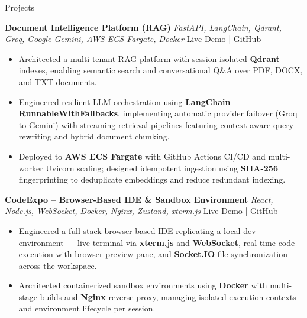 \documentclass{resume}
\begin{document}
\begin{rSection}{Projects}

\scriptsize \textbf{Document Intelligence Platform (RAG)}
{\scriptsize \textit{FastAPI, LangChain, Qdrant, Groq, Google Gemini, AWS ECS Fargate, Docker}}
\hfill
\href{https://aidoc.harshsaw.ca/}{Live Demo} | 
\href{https://github.com/Harshksaw/document_portal}{GitHub}

\begin{itemize}\itemsep -4pt
    \item Architected a multi-tenant RAG platform with session-isolated \textbf{Qdrant} indexes, enabling semantic search and conversational Q\&A over PDF, DOCX, and TXT documents.
    \item Engineered resilient LLM orchestration using \textbf{LangChain RunnableWithFallbacks}, implementing automatic provider failover (Groq to Gemini) with streaming retrieval pipelines featuring context-aware query rewriting and hybrid document chunking.
    \item Deployed to \textbf{AWS ECS Fargate} with GitHub Actions CI/CD and multi-worker Uvicorn scaling; designed idempotent ingestion using \textbf{SHA-256} fingerprinting to deduplicate embeddings and reduce redundant indexing.
\end{itemize}

\scriptsize \textbf{CodeExpo -- Browser-Based IDE \& Sandbox Environment}
{\scriptsize \textit{React, Node.js, WebSocket, Docker, Nginx, Zustand, xterm.js}}
\hfill
\href{https://code.harshsaw.ca}{Live Demo} |
\href{https://github.com/Harshksaw/Project-IDX-Codesandbox}{GitHub}
\begin{itemize}\itemsep -4pt
    \item Engineered a full-stack browser-based IDE replicating a local dev environment --- live terminal via \textbf{xterm.js} and \textbf{WebSocket}, real-time code execution with browser preview pane, and \textbf{Socket.IO} file synchronization across the workspace.
    \item Architected containerized sandbox environments using \textbf{Docker} with multi-stage builds and \textbf{Nginx} reverse proxy, managing isolated execution contexts and environment lifecycle per session.
    \end{itemize}

\end{rSection}\vspace{-0.7em}
\end{document}
